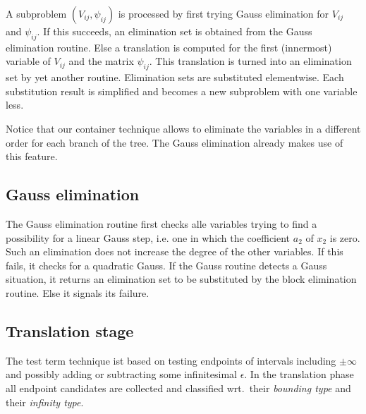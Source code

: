 A subproblem $(V_{ij},\psi_{ij})$ is processed by first trying Gauss
elimination for $V_{ij}$ and $\psi_{ij}$. If this succeeds, an
elimination set is obtained from the Gauss elimination routine. Else a
translation is computed for the first (innermost) variable of $V_{ij}$
and the matrix $\psi_{ij}$. This translation is turned into an
elimination set by yet another routine. Elimination sets are
substituted elementwise. Each substitution result is simplified and
becomes a new subproblem with one variable less.

Notice that our container technique allows to eliminate the variables
in a different order for each branch of the tree. The Gauss
elimination already makes use of this feature.
%
\subsection{Gauss elimination}\label{gaussnow}
The Gauss elimination routine first checks alle variables trying to
find a possibility for a linear Gauss step, i.e. one in which the
coefficient $a_2$ of $x_2$ is zero. Such an elimination does not
increase the degree of the other variables. If this fails, it checks
for a quadratic Gauss. If the Gauss routine detects a Gauss situation,
it returns an elimination set to be substituted by the block
elimination routine. Else it signals its failure.
%
\subsection{Translation stage}
The test term technique ist based on testing endpoints of intervals
including $\pm\infty$ and possibly adding or subtracting some
infinitesimal $\epsilon$. In the translation phase all endpoint
candidates are collected and classified wrt.~their {\em bounding type}
and their {\em infinity type}.

